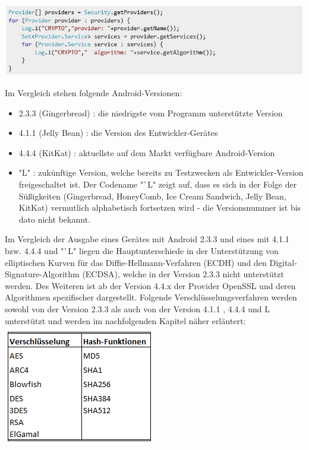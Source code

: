 \documentclass[10pt, a4paper,headsepline]{scrreprt}
\begin{document}
\begin{center}
\includegraphics[scale=0.8]{read_cryptoprovider.JPG} 
\end{center}
Im Vergleich stehen folgende Android-Versionen:
\begin{itemize}
\item 2.3.3 (Gingerbread) : die niedrigste vom Programm unterstützte Version
\item 4.1.1 (Jelly Bean) : die Version des Entwickler-Gerätes
\item 4.4.4 (KitKat) : aktuellste auf dem Markt verfügbare Android-Version
\item "L" : zukünftige Version, welche bereits zu Testzwecken als Entwickler-Version freigeschaltet ist. Der Codename "`L" zeigt auf, dass es sich in der Folge der Süßigkeiten (Gingerbread, HoneyComb, Ice Cream Sandwich, Jelly Bean, KitKat) vermutlich alphabetisch fortsetzen wird - die Versionsnummer ist bis dato nicht bekannt.
\end{itemize}
Im Vergleich der Ausgabe eines Gerätes mit Android 2.3.3 und eines mit 4.1.1 bzw. 4.4.4 und "`L" liegen die Hauptunterschiede in der Unterstützung von elliptischen Kurven für das Diffie-Hellmann-Verfahren (ECDH) und den Digital-Signature-Algorithm (ECDSA), welche in der Version 2.3.3 nicht unterstützt werden. Des Weiteren ist ab der Version 4.4.x der Provider OpenSSL und deren Algorithmen spezifischer dargestellt.
Folgende Verschlüsselungsverfahren werden sowohl von der Version 2.3.3 als auch von der Version 4.1.1 , 4.4.4 und L unterstützt und werden im nachfolgenden Kapitel näher erläutert: \\

\includegraphics[scale=1.0]{vorh_crypto.PNG}
\hfill
\end{document}
